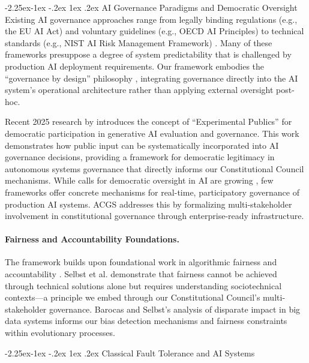 \documentclass[manuscript,screen,9pt]{acmart}
\makeatletter
\renewcommand\subsection{\@startsection{subsection}{2}{\z@}%
  {-2.25ex\@plus -1ex \@minus -.2ex}%
  {1ex \@plus .2ex}%
  {\normalfont\large\bfseries}}
\makeatother
\begin{document}
\subsection{AI Governance Paradigms and Democratic Oversight}
Existing AI governance approaches range from legally binding regulations (e.g., the EU AI Act) and voluntary guidelines (e.g., OECD AI Principles) to technical standards (e.g., NIST AI Risk Management Framework) \cite{Wynants2025ETHICAL, WorldBank2024AIGovernance, CambridgeUP2024CorporateGovernance}. Many of these frameworks presuppose a degree of system predictability that is challenged by production AI deployment requirements. Our framework embodies the ``governance by design'' philosophy \cite{Engin2025AdaptiveAIGovernance}, integrating governance directly into the AI system's operational architecture rather than applying external oversight post-hoc.

Recent 2025 research by \citet{Knight2025ExperimentalPublics} introduces the concept of ``Experimental Publics'' for democratic participation in generative AI evaluation and governance. This work demonstrates how public input can be systematically incorporated into AI governance decisions, providing a framework for democratic legitimacy in autonomous systems governance that directly informs our Constitutional Council mechanisms. While calls for democratic oversight in AI are growing \cite{Hwang2025PublicCAI}, few frameworks offer concrete mechanisms for real-time, participatory governance of production AI systems. ACGS addresses this by formalizing multi-stakeholder involvement in constitutional governance through enterprise-ready infrastructure.

\paragraph{Fairness and Accountability Foundations.} The framework builds upon foundational work in algorithmic fairness and accountability \cite{Selbst2019FairnessAccountability, Barocas2016BigDataDisparate}. Selbst et al. demonstrate that fairness cannot be achieved through technical solutions alone but requires understanding sociotechnical contexts---a principle we embed through our Constitutional Council's multi-stakeholder governance. Barocas and Selbst's analysis of disparate impact in big data systems informs our bias detection mechanisms and fairness constraints within evolutionary processes.

\subsection{Classical Fault Tolerance and AI Systems}
\label{subsec:classical_fault_tolerance}
\end{document}
